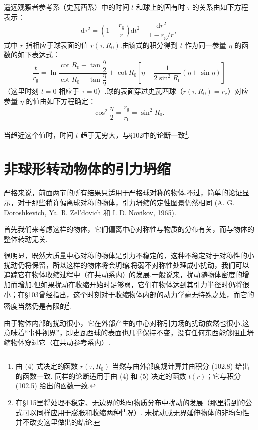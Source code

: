 \begin{xiti}
遥远观察者参考系（史瓦西系）中的时间 $t$ 和球上的固有时 $\tau$ 的关系由如下方程表示：
\begin{equation*}
  \mathrm{d}\tau^{2}=\left(1-\frac{r_{\mathrm{g}}}{r}\right)\mathrm{d}t^{2}
  -\frac{\mathrm{d}r^{2}}{1-r_{\mathrm{g}}/r},
\end{equation*}
式中 $r$ 指相应于球表面的值 $r(\tau,R_0)$.由该式的积分得到 $t$ 作为同一参量 $\eta$ 的函数的如下表达式：
\begin{equation}
  \frac{t}{r_{\mathrm{g}}}
  =\ln\frac{\cot R_0+\tan\dfrac{\eta}{2}}
  {\cot R_0-\tan\dfrac{\eta}{2}}
  +\cot R_0\left[\eta
  +\frac{1}{2\sin^{2}R_0}(\eta+\sin\eta)\right]
  \tag{5}
\end{equation}
（这里时刻 $t=0$ 相应于 $\tau=0$）.球的表面穿过史瓦西球（$r(\tau,R_0)=r_{\mathrm{g}}$）对应参量 $\eta$ 的值由如下方程确定：
\begin{equation*}
  \cos^{2}\frac{\eta}{2}=\frac{r_{\mathrm{g}}}{r_0}
  =\sin^{2}R_0.
\end{equation*}

当趋近这个值时，时间 $t$ 趋于无穷大，与§102中的论断一致\footnote{由 (4) 式决定的函数 $r(\tau,R_{0})$ 当然与由外部度规计算并由积分 (102.8) 给出的函数一致. 同样的论断适用于由 (4) 和 (5) 决定的函数 $t(r)$；它与积分 (102.5) 给出的函数一致.}.

\end{xiti}
\section{非球形转动物体的引力坍缩}

严格来说，前面两节的所有结果只适用于严格球对称的物体.不过，简单的论证显示，对于那些稍许偏离球对称的物体，引力坍缩的定性图景仍然相同 (A. G. Doroshkevich, Ya. B. Zel'dovich 和 I. D. Novikov, 1965).

首先我们来考虑这样的物体，它们偏离中心对称性与物质的分布有关，而与物体的整体转动无关.

很明显，既然大质量中心对称的物体是引力不稳定的，这种不稳定对于对称性的小扰动仍将保留，所以这样的物体将会坍缩.将弱不对称性处理成小扰动，我们可以追踪它在物体收缩过程中（在共动系内）的发展.一般说来，扰动随物体密度的增加而增加.但如果扰动在收缩开始时足够弱，它们在物体达到其引力半径时仍将很小；在§103曾经指出，这个时刻对于收缩物体内部的动力学毫无特殊之处，而它的密度当然仍是有限的\footnote{在§115里将处理不稳定、无边界的均匀物质分布中扰动的发展（那里得到的公式可以同样应用于膨胀和收缩两种情况）. 未扰动或无界延伸物体的非均匀性并不改变这里做出的结论.}.

由于物体内部的扰动很小，它在外部产生的中心对称引力场的扰动依然也很小.这意味着“事件视界”，即史瓦西球的表面也几乎保持不变，没有任何东西能够阻止坍缩物体穿过它（在共动参考系内）.

